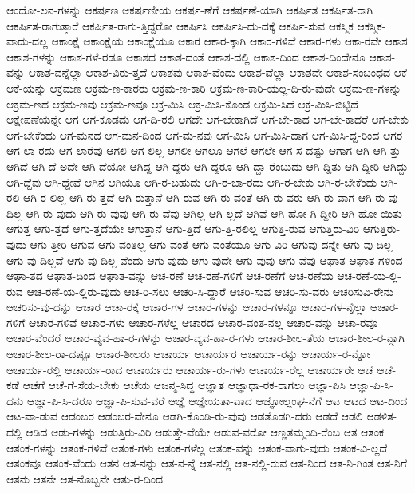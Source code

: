 {ಆಂದೋ-ಲನ-ಗಳನ್ನು
ಆಕರ್ಷಣ
ಆಕರ್ಷಣೀಯ
ಆಕರ್ಷ-ಣೆಗೆ
ಆಕರ್ಷಣೆ-ಯಾಗಿ
ಆಕರ್ಷಿತ
ಆಕರ್ಷಿತ-ರಾಗಿ
ಆಕರ್ಷಿತ-ರಾಗುತ್ತಾರೆ
ಆಕರ್ಷಿತ-ರಾಗು-ತ್ತಿದ್ದರೋ
ಆಕರ್ಷಿಸಿ
ಆಕರ್ಷಿಸಿ-ದು-ದಕ್ಕೆ
ಆಕರ್ಷಿ-ಸುವ
ಆಕಸ್ಮಿಕ
ಆಕಸ್ಮಿಕ-ವಾದು-ದಲ್ಲ
ಆಕಾಂಕ್ಷೆ
ಆಕಾಂಕ್ಷೆಯ
ಆಕಾಂಕ್ಷೆಯೂ
ಆಕಾರ
ಆಕಾರ-ಕ್ಕಾಗಿ
ಆಕಾರ-ಗಳಿವೆ
ಆಕಾರ-ಗಳು
ಆಕಾ-ರವೇ
ಆಕಾಶ
ಆಕಾಶ-ಗಳನ್ನು
ಆಕಾಶ-ಗಳೆ-ರಡೂ
ಆಕಾಶದ
ಆಕಾಶ-ದಂತೆ
ಆಕಾಶ-ದಲ್ಲಿ
ಆಕಾಶ-ದಿಂದ
ಆಕಾಶ-ದಿಂದೇನೂ
ಆಕಾಶ-ವನ್ನು
ಆಕಾಶ-ವನ್ನೆಲ್ಲಾ
ಆಕಾಶ-ವಿರು-ತ್ತದೆ
ಆಕಾಶವು
ಆಕಾಶ-ವೆಂದು
ಆಕಾಶ-ವೆಲ್ಲಾ
ಆಕಾಶವೇ
ಆಕಾಶ-ಸಂಬಂಧದ
ಆಕೆ
ಆಕೆ-ಯನ್ನು
ಆಕ್ರಮಣ
ಆಕ್ರಮ-ಣ-ಕಾರರು
ಆಕ್ರಮ-ಣ-ಕಾರಿ
ಆಕ್ರಮ-ಣ-ಕಾರಿ-ಯಲ್ಲ-ದಿ-ರು-ವುದೇ
ಆಕ್ರಮ-ಣ-ಗಳನ್ನು
ಆಕ್ರಮ-ಣದ
ಆಕ್ರಮ-ಣವು
ಆಕ್ರಮ-ಣವೂ
ಆಕ್ರ-ಮಿಸಿ
ಆಕ್ರ-ಮಿಸಿ-ಕೊಂಡ
ಆಕ್ರಮಿ-ಸಿದೆ
ಆಕ್ರ-ಮಿಸಿ-ಬಿಟ್ಟಿದೆ
ಆಕ್ಷೇಪಣೆಯನ್ನೇ
ಆಗ
ಆಗ-ಕೂಡದು
ಆಗ-ದಿ-ರಲಿ
ಆಗದೇ
ಆಗ-ಬೇಕಾಗಿದೆ
ಆಗ-ಬೇ-ಕಾದ
ಆಗ-ಬೇ-ಕಾದರೆ
ಆಗ-ಬೇಕು
ಆಗ-ಬೇಕೆಂದು
ಆಗ-ಮನದ
ಆಗ-ಮನ-ದಿಂದ
ಆಗ-ಮ-ನವು
ಆಗ-ಮಿಸಿ
ಆಗ-ಮಿಸಿ-ದಾಗ
ಆಗ-ಮಿಸಿ-ದ್ದ-ರಿಂದ
ಆಗರ
ಆಗ-ಲಾ-ರದು
ಆಗ-ಲಾರೆವು
ಆಗಲಿ
ಆಗ-ಲಿಲ್ಲ
ಆಗಲೀ
ಆಗಲೂ
ಆಗಲೆ
ಆಗಲೇ
ಆಗ-ಸ-ದಷ್ಟು
ಆಗಾಗ
ಆಗಿ
ಆಗಿ-ತ್ತು
ಆಗಿದೆ
ಆಗಿ-ದೆ-ಅದೇ
ಆಗಿ-ದೆಯೋ
ಆಗಿದ್ದ
ಆಗಿ-ದ್ದರು
ಆಗಿ-ದ್ದರೂ
ಆಗಿ-ದ್ದಾ-ರೆಂಬುದು
ಆಗಿ-ದ್ದಿತು
ಆಗಿ-ದ್ದೀರಿ
ಆಗಿದ್ದು
ಆಗಿ-ದ್ದೆವು
ಆಗಿ-ದ್ದೇವೆ
ಆಗಿನ
ಆಗಿಯೂ
ಆಗಿ-ರ-ಬಹುದು
ಆಗಿ-ರ-ಬಾ-ರದು
ಆಗಿ-ರ-ಬೇಕು
ಆಗಿ-ರ-ಬೇಕೆಂದು
ಆಗಿ-ರಲಿ
ಆಗಿ-ರ-ಲಿಲ್ಲ
ಆಗಿ-ರು-ತ್ತದೆ
ಆಗಿ-ರುತ್ತಾನೆ
ಆಗಿ-ರುವ
ಆಗಿ-ರು-ವಂತೆ
ಆಗಿ-ರು-ವರು
ಆಗಿ-ರು-ವಾಗ
ಆಗಿ-ರು-ವು-ದಿಲ್ಲ
ಆಗಿ-ರು-ವುದು
ಆಗಿ-ರು-ವುವು
ಆಗಿ-ರು-ವೆವು
ಆಗಿಲ್ಲ
ಆಗಿ-ಲ್ಲದೆ
ಆಗಿವೆ
ಆಗಿ-ಹೋ-ಗಿ-ದ್ದೀರಿ
ಆಗಿ-ಹೋ-ಯಿತು
ಆಗುತ್ತ
ಆಗು-ತ್ತದೆ
ಆಗು-ತ್ತದೆಯೇ
ಆಗುತ್ತಾನೆ
ಆಗು-ತ್ತಿದೆ
ಆಗು-ತ್ತಿ-ರಲಿಲ್ಲ
ಆಗುತ್ತಿ-ರುವ
ಆಗುತ್ತಿರು-ವಿರಿ
ಆಗುತ್ತಿರು-ವುದು
ಆಗು-ತ್ತೀರಿ
ಆಗುವ
ಆಗು-ವಂತಿಲ್ಲ
ಆಗು-ವಂತೆ
ಆಗು-ವಂತೆಯೂ
ಆಗು-ವಿರಿ
ಆಗುವು-ದನ್ನೇ
ಆಗು-ವು-ದಿಲ್ಲ
ಆಗು-ವು-ದಿಲ್ಲವೆ
ಆಗು-ವು-ದಿಲ್ಲ-ವೆಂದು
ಆಗು-ವುದು
ಆಗು-ವುದೇ
ಆಗು-ವುವು
ಆಗು-ವೆವು
ಆಘಾತ
ಆಘಾತ-ಗಳಿಂದ
ಆಘಾ-ತದ
ಆಘಾತ-ದಿಂದ
ಆಘಾತ-ವನ್ನು
ಆಚ-ರಣೆ
ಆಚ-ರಣೆ-ಗಳಿಗೆ
ಆಚ-ರಣೆಗೆ
ಆಚ-ರಣೆಯ
ಆಚ-ರಣೆ-ಯ-ಲ್ಲಿ-ರುವ
ಆಚ-ರಣೆ-ಯ-ಲ್ಲಿರು-ವುದು
ಆಚ-ರಿ-ಸಲು
ಆಚರಿ-ಸಿ-ದ್ದಾರೆ
ಆಚರಿ-ಸುವ
ಆಚರಿ-ಸು-ವರು
ಆಚರಿಸುವಿ-ರೇನು
ಆಚರಿಸು-ವು-ದನ್ನು
ಆಚಾರ
ಆಚಾ-ರಕ್ಕೆ
ಆಚಾರ-ಗಳ
ಆಚಾರ-ಗಳನ್ನು
ಆಚಾರ-ಗಳನ್ನೂ
ಆಚಾರ-ಗಳ-ನ್ನೆಲ್ಲಾ
ಆಚಾರ-ಗಳಿಗೆ
ಆಚಾರ-ಗಳಿವೆ
ಆಚಾರ-ಗಳು
ಆಚಾರ-ಗಳೆಲ್ಲ
ಆಚಾರದ
ಆಚಾರ-ವಂತ-ನಲ್ಲ
ಆಚಾರ-ವನ್ನು
ಆಚಾ-ರವೂ
ಆಚಾರ-ವೆಂದರೆ
ಆಚಾರ-ವ್ಯವ-ಹಾ-ರ-ಗಳನ್ನು
ಆಚಾರ-ವ್ಯವ-ಹಾ-ರ-ಗಳು
ಆಚಾರ-ಶೀಲ-ತೆಯ
ಆಚಾರ-ಶೀಲ-ರ-ನ್ನಾಗಿ
ಆಚಾರ-ಶೀಲ-ರಾ-ದಷ್ಟೂ
ಆಚಾರ-ಶೀಲರು
ಆಚಾರ್ಯ
ಆಚಾರ್ಯರ
ಆಚಾರ್ಯ-ರನ್ನು
ಆಚಾರ್ಯ-ರ-ನ್ನೋ
ಆಚಾರ್ಯ-ರಲ್ಲಿ
ಆಚಾರ್ಯ-ರಾದ
ಆಚಾರ್ಯರು
ಆಚಾರ್ಯ-ರು-ಗಳು
ಆಚಾರ್ಯ-ರೆಲ್ಲ
ಆಚಾರ್ಯರೇ
ಆಚೆ
ಆಚೆ-ಕಡೆ
ಆಚೆಗೆ
ಆಚೆ-ಗೆ-ಸೆಯ-ಬೇಕು
ಆಚೆಯ
ಆಜನ್ಮ-ಸಿದ್ಧ
ಆಜ್ಞಾತ
ಆಜ್ಞಾಧಾ-ರಕ-ರಾಗಲು
ಆಜ್ಞಾ-ಪಿಸಿ
ಆಜ್ಞಾ-ಪಿ-ಸಿ-ದನು
ಆಜ್ಞಾ-ಪಿ-ಸಿ-ದರೂ
ಆಜ್ಞಾ-ಪಿ-ಸುವ-ವರೆ
ಆಜ್ಞೆ
ಆಜ್ಞೇಯತಾ-ವಾದ
ಆಜ್ಞೋಲ್ಲಂಘ-ನೆಗೆ
ಆಟ
ಆಟದ
ಆಟ-ದಿಂದ
ಆಟ-ವಾ-ಡುವ
ಆಡಂಬರ
ಆಡಂಬರ-ವೇನೂ
ಆಡಗಿ-ಕೊಂಡಿ-ರು-ವುವು
ಆಡತೊಡಗಿ-ದರು
ಆಡದೆ
ಆಡಲಿ
ಆಡಳಿತ-ದಲ್ಲಿ
ಆಡಿದ
ಆಡು-ಗಳನ್ನು
ಆಡುತ್ತಿರು-ವಿರಿ
ಆಡುತ್ತೇ-ವೆಯೇ
ಆಡುವ-ವರೋ
ಆಣ್ಣತಮ್ಮಂದಿ-ರೆಂಬ
ಆತ
ಆತಂಕ
ಆತಂಕ-ಗಳನ್ನು
ಆತಂಕ-ಗಳಿವೆ
ಆತಂಕ-ಗಳು
ಆತಂಕ-ಗಳೆಲ್ಲ
ಆತಂಕ-ವನ್ನು
ಆತಂಕ-ವಾಗು-ವುದು
ಆತಂಕ-ವಿ-ಲ್ಲದೆ
ಆತಂಕವೂ
ಆತಂಕ-ವೆಂದು
ಆತನ
ಆತ-ನನ್ನು
ಆತ-ನ-ನ್ನೆ
ಆತ-ನಲ್ಲಿ
ಆತ-ನಲ್ಲಿ-ರುವ
ಆತ-ನಿಂದ
ಆತ-ನಿ-ಗಿಂತ
ಆತ-ನಿಗೆ
ಆತನು
ಆತನೇ
ಆತ-ನೊಬ್ಬನೇ
ಆತು-ರ-ದಿಂದ
}
